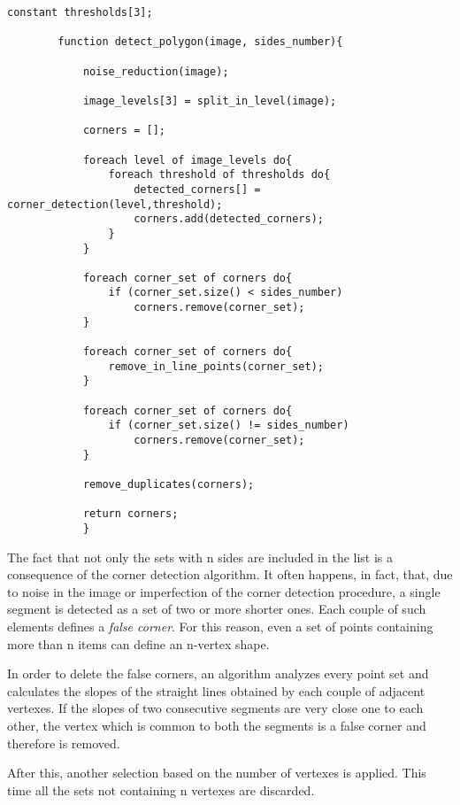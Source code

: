 	    	\begin{lstlisting}constant thresholds[3];	

		function detect_polygon(image, sides_number){

			noise_reduction(image);
		
			image_levels[3] = split_in_level(image);
		
			corners = [];
	
			foreach level of image_levels do{
				foreach threshold of thresholds do{
					detected_corners[] = corner_detection(level,threshold);
					corners.add(detected_corners);
				}
			}	
		
			foreach corner_set of corners do{
				if (corner_set.size() < sides_number)
					corners.remove(corner_set);
			}			

			foreach corner_set of corners do{
				remove_in_line_points(corner_set);
			}

			foreach corner_set of corners do{
				if (corner_set.size() != sides_number)
					corners.remove(corner_set);
			}

			remove_duplicates(corners);	
		
			return corners;
			}
		\end{lstlisting}

		The fact that not only the sets with n sides are included in the list is a consequence of the corner detection algorithm. 
		It often happens, in fact, that, due to noise in the image or imperfection of the corner detection procedure, a single segment is detected as a set of two or more shorter ones. 
		Each couple of such elements defines a \emph{false corner}. 
		For this reason, even a set of points containing more than n items can define an n-vertex shape. 


		In order to delete the false corners, an algorithm analyzes every point set and calculates the slopes of the straight lines obtained by each couple of adjacent vertexes. 
		If the slopes of two consecutive segments are very close one to each other, the vertex which is common to both the segments is a false corner and therefore is removed.
		

		
		After this, another selection based on the number of vertexes is applied. This time all the sets not containing n vertexes are discarded.

